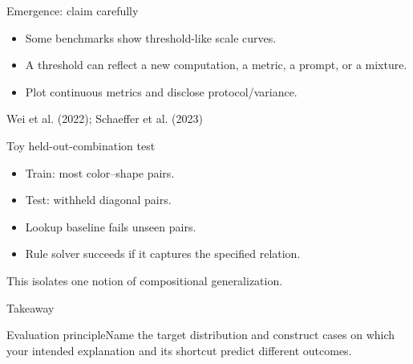 \documentclass[aspectratio=169,10pt]{beamer}\usetheme{metropolis}
\begin{document}
\begin{frame}{Emergence: claim carefully}\begin{itemize}\item Some benchmarks show threshold-like scale curves.\item A threshold can reflect a new computation, a metric, a prompt, or a mixture.\item Plot continuous metrics and disclose protocol/variance.\end{itemize}\vfill\small Wei et al. (2022); Schaeffer et al. (2023)\end{frame}
\begin{frame}{Toy held-out-combination test}\begin{itemize}\item Train: most color--shape pairs.\item Test: withheld diagonal pairs.\item Lookup baseline fails unseen pairs.\item Rule solver succeeds if it captures the specified relation.\end{itemize}\alert{This isolates one notion of compositional generalization.}\end{frame}
\begin{frame}{Takeaway}\begin{block}{Evaluation principle}Name the target distribution and construct cases on which your intended explanation and its shortcut predict different outcomes.\end{block}\end{frame}
\end{document}

